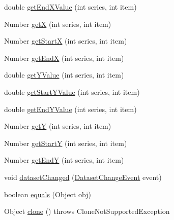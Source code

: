 \begin{DoxyCompactItemize}
double \mbox{\hyperlink{classorg_1_1jfree_1_1data_1_1gantt_1_1_x_y_task_dataset_a547af5fef423693d0b96a4a89060f8b8}{get\+End\+X\+Value}} (int series, int item)
\item 
Number \mbox{\hyperlink{classorg_1_1jfree_1_1data_1_1gantt_1_1_x_y_task_dataset_a782158dc49cc9885099754f4fefa45ce}{getX}} (int series, int item)
\item 
Number \mbox{\hyperlink{classorg_1_1jfree_1_1data_1_1gantt_1_1_x_y_task_dataset_afd4c9a195a8fd2699ed927b6c4f717c4}{get\+StartX}} (int series, int item)
\item 
Number \mbox{\hyperlink{classorg_1_1jfree_1_1data_1_1gantt_1_1_x_y_task_dataset_a6c72bd645d635c254bfdac3dfd15f2cf}{get\+EndX}} (int series, int item)
\item 
double \mbox{\hyperlink{classorg_1_1jfree_1_1data_1_1gantt_1_1_x_y_task_dataset_a5e6056162609e273bff52db664ee8bb2}{get\+Y\+Value}} (int series, int item)
\item 
double \mbox{\hyperlink{classorg_1_1jfree_1_1data_1_1gantt_1_1_x_y_task_dataset_a72a8034b2b668697fe4fb144f38f3806}{get\+Start\+Y\+Value}} (int series, int item)
\item 
double \mbox{\hyperlink{classorg_1_1jfree_1_1data_1_1gantt_1_1_x_y_task_dataset_a8524d9e1fec8959bd9dc9fe78688d5cf}{get\+End\+Y\+Value}} (int series, int item)
\item 
Number \mbox{\hyperlink{classorg_1_1jfree_1_1data_1_1gantt_1_1_x_y_task_dataset_af647b3b2fe8439c794156c0004fc3234}{getY}} (int series, int item)
\item 
Number \mbox{\hyperlink{classorg_1_1jfree_1_1data_1_1gantt_1_1_x_y_task_dataset_ac57b2efa4ecc02718674beae6f1526c0}{get\+StartY}} (int series, int item)
\item 
Number \mbox{\hyperlink{classorg_1_1jfree_1_1data_1_1gantt_1_1_x_y_task_dataset_a615ce13ed04f817b4b816cd9915b024e}{get\+EndY}} (int series, int item)
\item 
void \mbox{\hyperlink{classorg_1_1jfree_1_1data_1_1gantt_1_1_x_y_task_dataset_ac1eea7e4ceef30a38ca3001991648347}{dataset\+Changed}} (\mbox{\hyperlink{classorg_1_1jfree_1_1data_1_1general_1_1_dataset_change_event}{Dataset\+Change\+Event}} event)
\item 
boolean \mbox{\hyperlink{classorg_1_1jfree_1_1data_1_1gantt_1_1_x_y_task_dataset_a716ce2cb9b417860f0c9a1fc40944452}{equals}} (Object obj)
\item 
Object \mbox{\hyperlink{classorg_1_1jfree_1_1data_1_1gantt_1_1_x_y_task_dataset_ad283469621732008b8c21df49957f7e1}{clone}} ()  throws Clone\+Not\+Supported\+Exception 
\end{DoxyCompactItemize}
